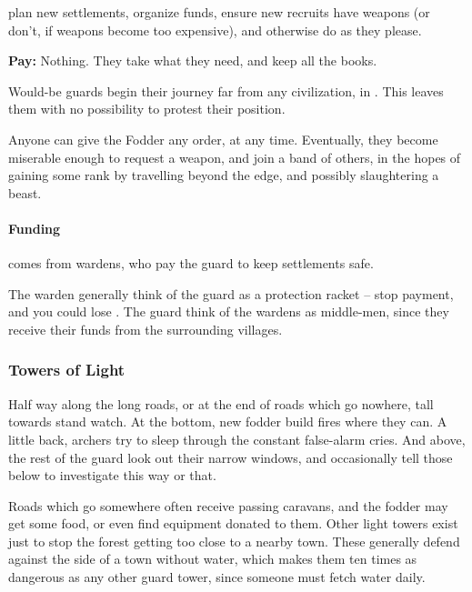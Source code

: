 \begin{multicols}{2}
\begin{description}
  plan new settlements, organize funds, ensure new recruits have weapons (or don't, if weapons become too expensive), and otherwise do as they please.

  \textbf{Pay:} Nothing.
  They take what they need, and keep all the books.

\end{description}

\noindent
Would-be \glspl{guard} begin their journey far from any civilization, in .
This leaves them with no possibility to protest their position.

Anyone can give the Fodder any order, at any time.
Eventually, they become miserable enough to request a weapon, and join a band of others, in the hopes of gaining some rank by travelling beyond the \gls{edge}, and possibly slaughtering a beast.


\paragraph{Funding}
comes from \glspl{warden}, who pay the guard to keep settlements safe.

The \gls{warden} generally think of the \gls{guard} as a protection racket -- stop payment, and you could lose .
The \gls{guard} think of the \glspl{warden} as middle-men, since they receive their funds from the surrounding \glspl{village}.

\subsubsection{Towers of Light}
Half way along the long roads, or at the end of roads which go nowhere, tall towards stand watch.
At the bottom, new fodder build fires where they can.
A little back, archers try to sleep through the constant false-alarm cries.
And above, the rest of the guard look out their narrow windows, and occasionally tell those below to investigate this way or that.

Roads which go somewhere often receive passing caravans, and the fodder may get some food, or even find equipment donated to them.
Other light towers exist just to stop the forest getting too close to a nearby town.
These generally defend against the side of a town without water, which makes them ten times as dangerous as any other \gls{guard} tower, since someone must fetch water daily.


\end{multicols}
